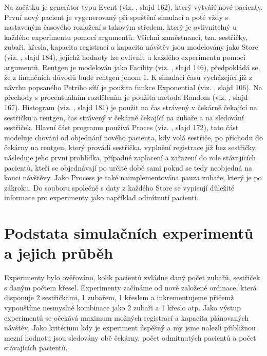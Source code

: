 \documentclass[a4paper,11pt,titlepage]{article}
\begin{document}
Na začátku je generátor typu Event (viz. \cite{ims}, slajd 162), který vytváří nové pacienty. První nový pacient je vygenerovaný při spuštění simulací a poté vždy s nastaveným časového rozložení s takovým středem, který je ovlivnitelný u každého experimentu pomocí argumentů.
\newline
Všichni zaměstnanci, tzn. sestřičky, zubaři, křesla, kapacita registrací a kapacita návštěv jsou modelovány jako Store (viz. \cite{ims}, slajd 184), jejichž hodnoty lze ovlivnit u každého experimentu pomocí argumentů.
\newline
Rentgen je modelován jako Facility (viz. \cite{ims}, slajd 146), předpokládá se, že z finančních důvodů bude rentgen jenom 1.
\newline
K simulaci času vycházející již z návrhu popsaného Petriho síťí je použita funkce Exponential (viz. \cite{ims}, slajd 106).
\newline
Na přechody s procentuálním rozdělením je použita metoda Random (viz. \cite{ims}, slajd 167).
\newline
Histogram (viz. \cite{ims}, slajd 181) je použit na čas strávený v čekárně čekající na sestřičku a rentgen, čas strávený v čekárně čekající na zubaře a na sledování sestřiček.
\newline
Hlavní část programu používá Proces (viz. \cite{ims}, slajd 172), tato část modeluje chování od objednání nového pacienta, kdy volá sestřiče, po příchodu do čekárny na rentgen, který provádí sestřička, vyplnění registrace již bez sestřičky, následuje jeho první prohlídka, případné zaplacení a zařazení do role stávajících pacientů, kteří se objednávají po určité době sami pokud se tedy neobjedná na konci návštěvy.
\newline
Jako Process je také naimplementována pauza zubaře, který je po zákroku.
\newline
Do souboru společně s daty z každého Store se vypisují důležité informace pro experimenty jako například odmítnutí pacienti.

\section{Podstata simulačních experimentů a jejich průběh}

Experimenty bylo ověřováno, kolik pacientů zvládne daný počet zubařů, sestřiček s daným počtem křesel. Experimenty začínáme od nově založené ordinace, která disponuje 2 sestřičkami, 1 zubařem, 1 křeslem a inkrementujeme přičemž vypouštíme nesmyslné kombinace jako 2 zubaři a 1 křeslo atp. Jako výstup experimentů se očekává maximum možných registrací a kapacita plánovaných návštěv. Jako kritérium kdy je experiment úspěšný a my jsme nalezli přibližnou mezní hodnotu jsou sledovány obě čekárny, počet odmítnutých pacientů a počet stávajících pacientů.
\end{document}
